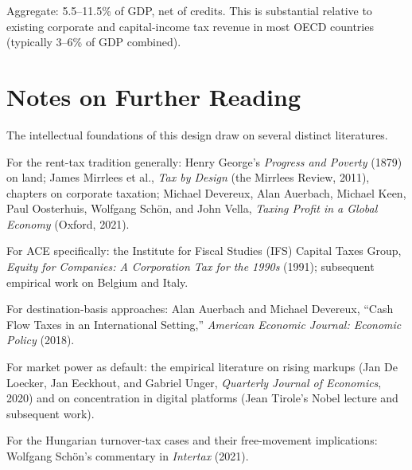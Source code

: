 \documentclass[11pt,a4paper]{article}
\begin{document}
Aggregate: 5.5--11.5\% of GDP, net of credits. This is substantial relative to existing corporate and capital-income tax revenue in most OECD countries (typically 3--6\% of GDP combined).

\section{Notes on Further Reading}

The intellectual foundations of this design draw on several distinct literatures.

For the rent-tax tradition generally: Henry George's \emph{Progress and Poverty} (1879) on land; James Mirrlees et al., \emph{Tax by Design} (the Mirrlees Review, 2011), chapters on corporate taxation; Michael Devereux, Alan Auerbach, Michael Keen, Paul Oosterhuis, Wolfgang Sch\"{o}n, and John Vella, \emph{Taxing Profit in a Global Economy} (Oxford, 2021).

For ACE specifically: the Institute for Fiscal Studies (IFS) Capital Taxes Group, \emph{Equity for Companies: A Corporation Tax for the 1990s} (1991); subsequent empirical work on Belgium and Italy.

For destination-basis approaches: Alan Auerbach and Michael Devereux, ``Cash Flow Taxes in an International Setting,'' \emph{American Economic Journal: Economic Policy} (2018).

For market power as default: the empirical literature on rising markups (Jan De Loecker, Jan Eeckhout, and Gabriel Unger, \emph{Quarterly Journal of Economics}, 2020) and on concentration in digital platforms (Jean Tirole's Nobel lecture and subsequent work).

For the Hungarian turnover-tax cases and their free-movement implications: Wolfgang Sch\"{o}n's commentary in \emph{Intertax} (2021).
\end{document}
